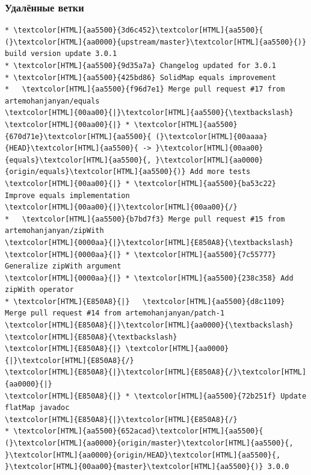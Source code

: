 \documentclass[pdf,russian]{beamer}
\begin{document}
\begin{frame}[fragile]
    \frametitle{Удалённые ветки}
    \begin{Verbatim}[commandchars=\\\{\},fontsize=\relsize{-2}]
* \textcolor[HTML]{aa5500}{3d6c452}\textcolor[HTML]{aa5500}{ (}\textcolor[HTML]{aa0000}{upstream/master}\textcolor[HTML]{aa5500}{)} build version update 3.0.1
* \textcolor[HTML]{aa5500}{9d35a7a} Changelog updated for 3.0.1
* \textcolor[HTML]{aa5500}{425bd86} SolidMap equals improvement
*   \textcolor[HTML]{aa5500}{f96d7e1} Merge pull request #17 from artemohanjanyan/equals
\textcolor[HTML]{00aa00}{|}\textcolor[HTML]{aa5500}{\textbackslash}  
\textcolor[HTML]{00aa00}{|} * \textcolor[HTML]{aa5500}{670d71e}\textcolor[HTML]{aa5500}{ (}\textcolor[HTML]{00aaaa}{HEAD}\textcolor[HTML]{aa5500}{ -> }\textcolor[HTML]{00aa00}{equals}\textcolor[HTML]{aa5500}{, }\textcolor[HTML]{aa0000}{origin/equals}\textcolor[HTML]{aa5500}{)} Add more tests
\textcolor[HTML]{00aa00}{|} * \textcolor[HTML]{aa5500}{ba53c22} Improve equals implementation
\textcolor[HTML]{00aa00}{|}\textcolor[HTML]{00aa00}{/}  
*   \textcolor[HTML]{aa5500}{b7bd7f3} Merge pull request #15 from artemohanjanyan/zipWith
\textcolor[HTML]{0000aa}{|}\textcolor[HTML]{E850A8}{\textbackslash}  
\textcolor[HTML]{0000aa}{|} * \textcolor[HTML]{aa5500}{7c55777} Generalize zipWith argument
\textcolor[HTML]{0000aa}{|} * \textcolor[HTML]{aa5500}{238c358} Add zipWith operator
* \textcolor[HTML]{E850A8}{|}   \textcolor[HTML]{aa5500}{d8c1109} Merge pull request #14 from artemohanjanyan/patch-1
\textcolor[HTML]{E850A8}{|}\textcolor[HTML]{aa0000}{\textbackslash} \textcolor[HTML]{E850A8}{\textbackslash}  
\textcolor[HTML]{E850A8}{|} \textcolor[HTML]{aa0000}{|}\textcolor[HTML]{E850A8}{/}  
\textcolor[HTML]{E850A8}{|}\textcolor[HTML]{E850A8}{/}\textcolor[HTML]{aa0000}{|}   
\textcolor[HTML]{E850A8}{|} * \textcolor[HTML]{aa5500}{72b251f} Update flatMap javadoc
\textcolor[HTML]{E850A8}{|}\textcolor[HTML]{E850A8}{/}  
* \textcolor[HTML]{aa5500}{652acad}\textcolor[HTML]{aa5500}{ (}\textcolor[HTML]{aa0000}{origin/master}\textcolor[HTML]{aa5500}{, }\textcolor[HTML]{aa0000}{origin/HEAD}\textcolor[HTML]{aa5500}{, }\textcolor[HTML]{00aa00}{master}\textcolor[HTML]{aa5500}{)} 3.0.0
    \end{Verbatim}
\end{frame}
\end{document}
